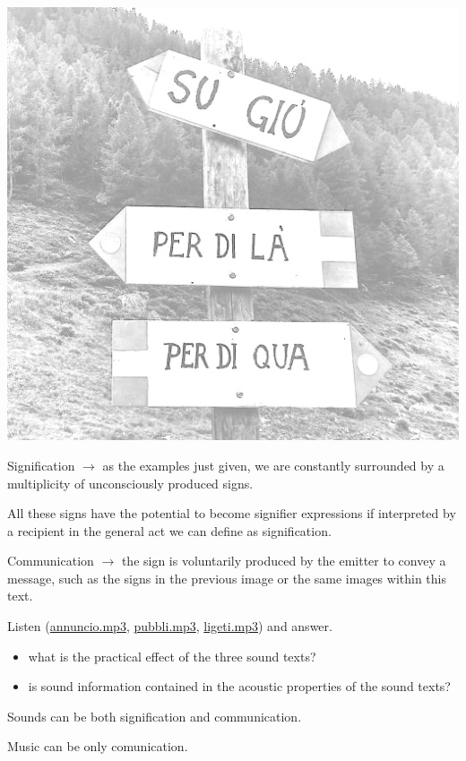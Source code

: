 \begin{center}
\includegraphics[scale=0.35]{../img/cartello.png}
\end{center}

Signification \(\rightarrow\) as the examples just given, we are constantly surrounded by a multiplicity of unconsciously produced signs.

All these signs have the potential to become signifier expressions if interpreted by a recipient in the general act we can define as signification.

Communication \(\rightarrow\) the sign is voluntarily produced by the emitter to convey a message, such as the signs in the previous image or the same images within this text.

Listen (\href{URL}{annuncio.mp3}, \href{URL}{pubbli.mp3}, \href{URL}{ligeti.mp3}) and answer.

\begin{itemize}
\tightlist
\item what is the practical effect of the three sound texts?
\item is sound information contained in the acoustic properties of the sound texts?
\end{itemize}

Sounds can be both signification and communication.

Music can be only comunication.

